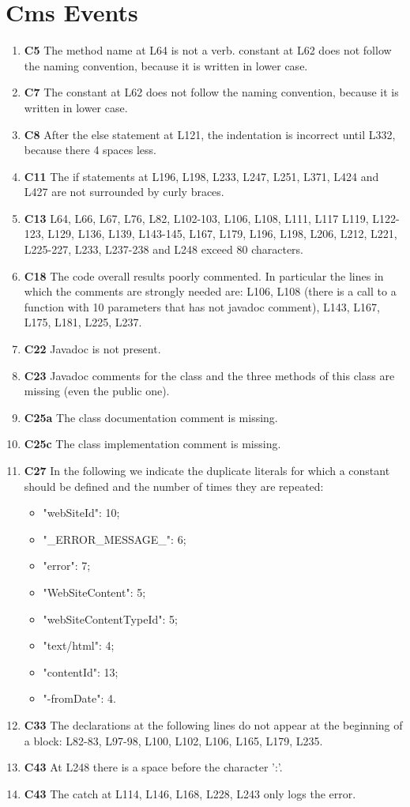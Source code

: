 \section{Cms Events}

\begin{enumerate}
\item \textbf{C5} The method name at L64 is not a verb. constant at L62 does not follow the naming convention, because it is written in lower case.
\item \textbf{C7} The constant at L62 does not follow the naming convention, because it is written in lower case.
\item \textbf{C8} After the else statement at L121, the indentation is incorrect until L332, because there 4 spaces less.
\item \textbf{C11} The if statements at L196, L198, L233, L247, L251, L371, L424 and L427 are not surrounded by curly braces.
\item \textbf{C13} L64, L66, L67, L76, L82, L102-103, L106, L108, L111, L117 L119, L122-123, L129, L136, L139, L143-145, L167, L179, L196, L198, L206, L212, L221, L225-227, L233, L237-238 and L248 exceed 80 characters.
\item \textbf{C18} The code overall results poorly commented. In particular the lines in which the comments are strongly needed are: L106, L108 (there is a call to a function with 10 parameters that has not javadoc comment), L143, L167, L175, L181, L225, L237.
\item \textbf{C22} Javadoc is not present.
\item \textbf{C23} Javadoc comments for the class and the three methods of this class are missing (even the public one).
\item \textbf{C25a} The class documentation comment is missing.
\item \textbf{C25c} The class implementation comment is missing.
\item \textbf{C27} In the following we indicate the duplicate literals for which a constant should be defined and the number of times they are repeated:
	\begin{itemize}
	\item "webSiteId": 10;
	\item "\_ERROR\_MESSAGE\_": 6;
	\item "error": 7;
	\item "WebSiteContent": 5;
	\item "webSiteContentTypeId": 5;
	\item "text/html": 4;
	\item "contentId": 13;
	\item "-fromDate": 4.
	\end{itemize} 
\item \textbf{C33} The declarations at the following lines do not appear at the beginning of a block: L82-83, L97-98, L100, L102, L106, L165, L179, L235. 
\item \textbf{C43} At L248 there is a space before the character ':'.
\item \textbf{C43} The catch at L114, L146, L168, L228, L243 only logs the error.
\end{enumerate}